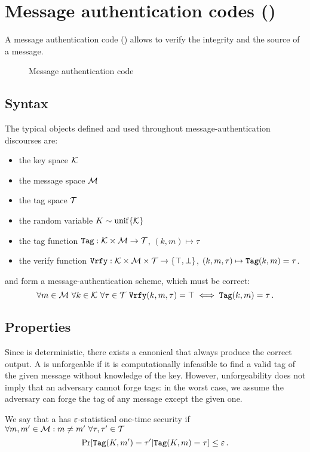 
\section{Message authentication codes (\Mac)}
A message authentication code (\Mac) allows to verify the integrity and the source of a message.

\begin{figure}[h]
	\centering
	
	\caption{Message authentication code}
\end{figure}


\subsection{Syntax}
The typical objects defined and used throughout message-authentication discourses are:
\begin{itemize}[itemsep=1pt,parsep=0pt]
	\item the key space $\mathcal{K}$
	\item the message space $\mathcal{M}$
	\item the tag space $\mathcal{T}$
	\item the random variable $K \sim \operatorname{unif}\{\mathcal{K}\}$
    \item the tag function $\texttt{Tag} : \mathcal{K} \times \mathcal{M} \to \mathcal{T}$, $(k, m) \mapsto \tau$
    \item the verify function $\texttt{Vrfy} : \mathcal{K} \times \mathcal{M} \times \mathcal{T} \to \{\top, \bot\}$, $(k, m, \tau) \mapsto \texttt{Tag}(k, m) = \tau$.
\end{itemize}
\Tag{} and \Vrfy{} form a message-authentication scheme, which must be correct:
\[
	\forall m \in \M \ \forall k \in \K \ \forall \tau \in \Tau \ \Vrfy(k, m, \tau) = \top \iff \Tag(k, m) = \tau \, .
\]


\subsection{Properties}
Since \Tag{} is deterministic, there exists a canonical \Vrfy{} that always produce the correct output.
A \Mac{} is unforgeable if it is computationally infeasible to find a valid tag of the given message without knowledge of the key.
However, unforgeability does not imply that an adversary cannot forge tags: in the worst case, we assume the adversary can forge the tag of any message except the given one.

\begin{definition}
	We say that a \Mac{} has $\varepsilon$-statistical one-time security if $\forall m, m' \in \mathcal{M} : m \neq m' \ \forall \tau, \tau' \in \mathcal{T}$
	\begin{equation}
		\Pr[\texttt{Tag}(K,m') = \tau' | \texttt{Tag}(K,m) = \tau] \leq \varepsilon \, .
	\end{equation}
\end{definition}

